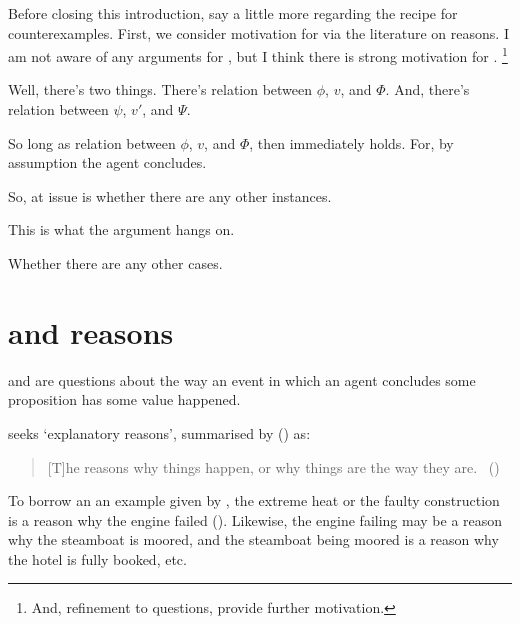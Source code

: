 \begin{note}
  Before closing this introduction, say a little more regarding the recipe for counterexamples.
  First, we consider motivation for \issueInclusion{} via the literature on reasons.
  I am not aware of any arguments for \issueInclusion{}, but I think there is strong motivation for \issueInclusion{}.%
  \footnote{
    \color{red}
    And, refinement to questions, provide further motivation.
  }
\end{note}

\begin{note}
  \color{red}

  Well, there's two things.
  There's relation between \(\phi\), \(v\), and \(\Phi\).
  And, there's relation between \(\psi\), \(v'\), and \(\Psi\).

  So long as relation between \(\phi\), \(v\), and \(\Phi\), then immediately holds.
  For, by assumption the agent concludes.

  So, at issue is whether there are any other instances.

  This is what the argument hangs on.

  Whether there are any other cases.
\end{note}

\section*{\issueInclusion{} and reasons}
\label{sec:reasons}

\begin{note}
  \qWhy{} and \qHow{} are questions about the way an event in which an agent concludes some proposition has some value happened.

  \qWhy{} seeks `explanatory reasons', summarised by \citeauthor{Hieronymi:2011aa} (\citeyear{Hieronymi:2011aa}) as:

  \begin{quote}
    [T]he reasons why things happen, or why things are the way they are.\newline
    \mbox{ }\hfill\mbox{(\citeyear[410]{Hieronymi:2011aa})}
  \end{quote}

  To borrow an an example given by \citeauthor{Hieronymi:2011aa}, the extreme heat or the faulty construction is a reason why the engine failed (\citeyear[409]{Hieronymi:2011aa}).
  Likewise, the engine failing may be a reason why the steamboat is moored, and the steamboat being moored is a reason why the hotel is fully booked, etc.
\end{note}

